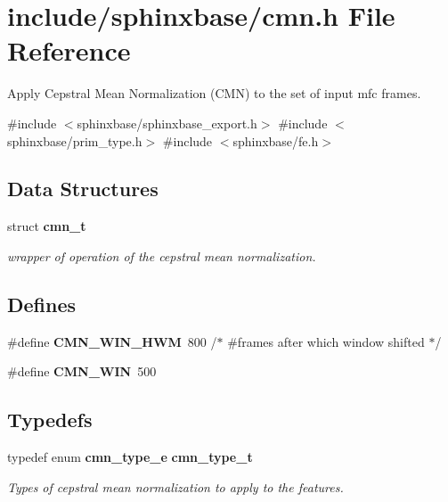 \section{include/sphinxbase/cmn.h \-File \-Reference}
\label{cmn_8h}


\-Apply \-Cepstral \-Mean \-Normalization (\-C\-M\-N) to the set of input mfc frames.  


{\ttfamily \#include $<$sphinxbase/sphinxbase\-\_\-export.\-h$>$}\*
{\ttfamily \#include $<$sphinxbase/prim\-\_\-type.\-h$>$}\*
{\ttfamily \#include $<$sphinxbase/fe.\-h$>$}\*
\subsection*{\-Data \-Structures}
\begin{DoxyCompactItemize}
\item 
struct {\bf cmn\-\_\-t}
\begin{DoxyCompactList}\small\item\em wrapper of operation of the cepstral mean normalization. \end{DoxyCompactList}\end{DoxyCompactItemize}
\subsection*{\-Defines}
\begin{DoxyCompactItemize}
\item 
\#define {\bfseries \-C\-M\-N\-\_\-\-W\-I\-N\-\_\-\-H\-W\-M}~800     /$\ast$ \#frames after which window shifted $\ast$/\label{cmn_8h_abbf37b74032c295136b4b299ecfcedae}

\item 
\#define {\bfseries \-C\-M\-N\-\_\-\-W\-I\-N}~500\label{cmn_8h_a500dafed8351d334da9290ec4f3f6ab3}

\end{DoxyCompactItemize}
\subsection*{\-Typedefs}
\begin{DoxyCompactItemize}
\item 
typedef enum {\bf cmn\-\_\-type\-\_\-e} {\bf cmn\-\_\-type\-\_\-t}\label{cmn_8h_a9384c411b10e9db9745cfb550a5c7652}

\begin{DoxyCompactList}\small\item\em \-Types of cepstral mean normalization to apply to the features. \end{DoxyCompactList}\end{DoxyCompactItemize}
